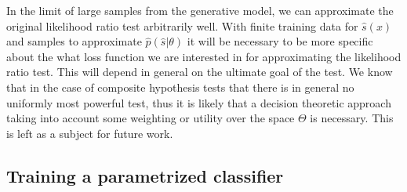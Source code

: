 \documentclass[aoas,preprint]{imsart}
\numberwithin{equation}{section}
\theoremstyle{plain}
\begin{document}
%
%



In the  limit of large samples from the generative model,  we can approximate the original likelihood ratio test arbitrarily well. With finite training data for $\hat{s}(x)$ and samples to approximate $\hat{p}(\hat{s}|\theta)$ it will be necessary to be more specific about the what loss function we are interested in for approximating the likelihood ratio test. This will depend in general on the ultimate goal of the test. We know that in the case of composite hypothesis tests that there is in general no uniformly most powerful test, thus it is likely that a decision theoretic approach taking into account some weighting or utility over the space $\Theta$ is necessary. This is left as a subject for future work.


\subsection{Training a parametrized classifier}
\end{document}
